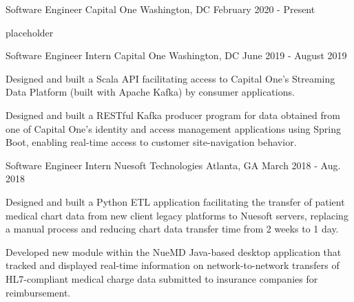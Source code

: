 
\begin{cventries}
  \cventry
    {Software Engineer} %
    {Capital One} %
    {Washington, DC} %
    {February 2020 - Present} %
    {
      \begin{cvitems} %
        \item {placeholder}
      \end{cvitems}
    }

  \cventry
    {Software Engineer Intern} %
    {Capital One} %
    {Washington, DC} %
    {June 2019 - August 2019} %
    {
      \begin{cvitems} %
        \item {Designed and built a Scala API facilitating access to Capital One’s Streaming Data Platform
        (built with Apache Kafka) by consumer applications.}
        \item {Designed and built a RESTful Kafka producer program for data obtained from one of Capital One’s 
        identity and access management applications using Spring Boot, enabling real-time access to customer 
        site-navigation behavior.}
      \end{cvitems}
    }

  \cventry
    {Software Engineer Intern} %
    {Nuesoft Technologies} %
    {Atlanta, GA} %
    {March 2018 - Aug. 2018} %
    {
      \begin{cvitems} %
        \item {Designed and built a Python ETL application facilitating the
        transfer of patient medical chart data from new client legacy platforms to Nuesoft servers, replacing a manual process and reducing chart data transfer time from 2 weeks to 1 day.}
        \item {Developed new module within the NueMD Java-based desktop application that tracked and displayed real-time information on network-to-network transfers of HL7-compliant medical charge data submitted to insurance companies for reimbursement.}
      \end{cvitems}
    }

\end{cventries}
